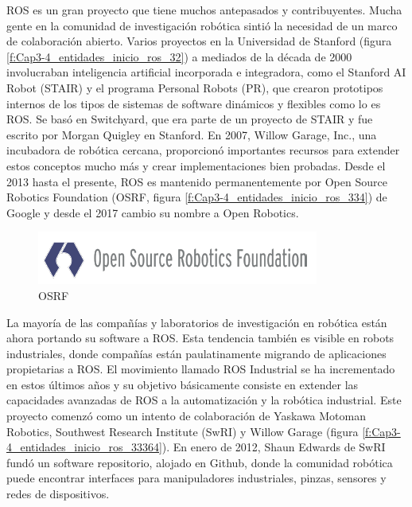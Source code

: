         ROS es un gran proyecto que tiene muchos antepasados y contribuyentes. Mucha gente en la comunidad de investigación robótica sintió la necesidad de un marco de colaboración abierto. Varios proyectos en la Universidad de Stanford (figura \eqref{f:Cap3-4_entidades_inicio_ros_32}) a mediados de la década de 2000 involucraban inteligencia artificial incorporada e integradora, como el Stanford AI Robot (STAIR) y el programa Personal Robots (PR), que crearon prototipos internos de los tipos de sistemas de software dinámicos y flexibles como lo es ROS. Se basó en Switchyard, que era parte de un proyecto de STAIR y fue escrito por Morgan Quigley en Stanford. En 2007, Willow Garage, Inc., una incubadora de robótica cercana, proporcionó importantes recursos para extender estos conceptos mucho más y crear implementaciones bien probadas. Desde el 2013 hasta el presente, ROS es mantenido permanentemente por Open Source Robotics Foundation (OSRF, figura \eqref{f:Cap3-4_entidades_inicio_ros_334}) de Google y desde el 2017 cambio su nombre a Open Robotics.
        
        \begin{figure}[htbp]
            \centering
            \includegraphics[width=0.7\linewidth]{Main/Chapter3/Images3/3-4/entidade-asociadas-al-inicio-de-ros-3.png}
            \caption{OSRF \cite{osrf}} 
            \label{f:Cap3-4_entidades_inicio_ros_334}
        \end{figure}        
        
        \newpage
        
        La mayoría de las compañías y laboratorios de investigación en robótica están ahora portando su software a ROS. Esta tendencia también es visible en robots industriales, donde compañías están paulatinamente migrando de aplicaciones propietarias a ROS. El movimiento llamado ROS Industrial se ha incrementado en estos últimos años y su objetivo básicamente consiste en extender las capacidades avanzadas de ROS a la automatización y la robótica industrial. Este proyecto comenzó como un intento de colaboración de Yaskawa Motoman Robotics, Southwest Research Institute (SwRI) y Willow Garage (figura \eqref{f:Cap3-4_entidades_inicio_ros_33364}). En enero de 2012, Shaun Edwards de SwRI fundó un software repositorio, alojado en Github, donde la comunidad robótica puede encontrar interfaces para manipuladores industriales, pinzas, sensores y redes de dispositivos.
        
